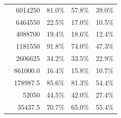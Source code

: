\begin{table}[!htbp]
\begin{tabular}{lrrrr}
\eeTo{ \Pquark \Pquark} &  6014250 & 81.0\%& 57.8\%& 39.0\%\\
\eeTo{ \Pquark \Pquark \Plepton \Pnu} &  6464550 & 22.5\%& 17.0\%& 10.5\%\\
\eeTo{ \Pquark \Pquark \Pl \Pl} &  4088700 & 19.4\%& 18.6\%& 12.4\%\\
\eeTo{ \Pquark \Pquark \Pnu \Pnu} & 1181550 & 91.8\%& 74.0\%& 47.3\% \\
\hline
\egamma{\Pepm}{\Pphoton}{\BS}{\Pepm \Pquark \Pquark \Pquark \Pquark} & 2606625  & 34.2\%& 33.5\%& 22.9\%\\
\egamma{\Pepm}{\Pphoton}{\EPA}{\Pepm \Pquark \Pquark \Pquark \Pquark} & 861000.0 & 16.4\%& 15.8\%& 10.7\%\\
\egamma{\Pepm}{\Pphoton}{\BS}{\Pnu \Pquark \Pquark \Pquark \Pquark}& 178987.5  & 85.6\%& 81.3\%& 54.4\%\\
\egamma{\Pepm}{\Pphoton}{\EPA}{\Pnu \Pquark \Pquark \Pquark \Pquark}& 52050  & 44.5\% & 42.0\%& 27.4\%\\
\egamma{\Pepm}{\Pphoton}{\BS}{\Pquark \Pquark \PHiggs \Pnu} & 35437.5  & 70.7\% & 65.0\%& 55.4\%\\

\end{tabular}
\end{table}
